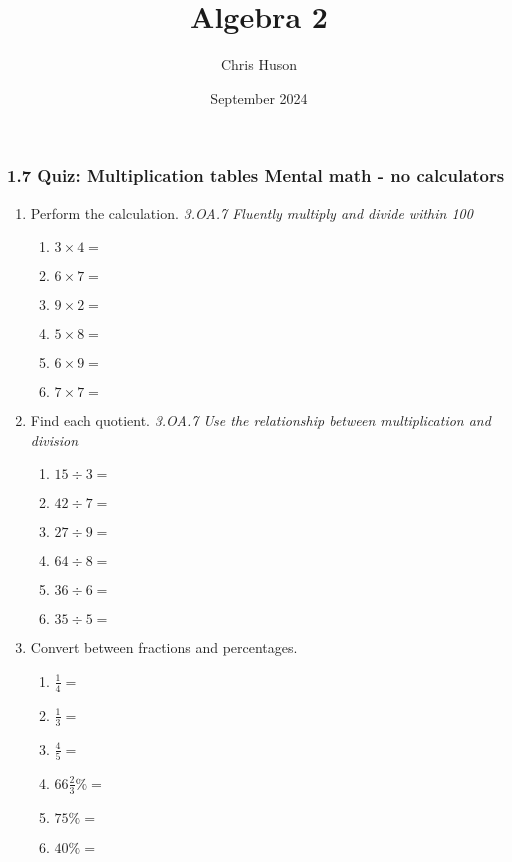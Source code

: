 \documentclass[12pt, twoside]{article}
\title{Algebra 2}
\author{Chris Huson}
\date{September 2024}
\begin{document}
\subsubsection*{1.7 Quiz: Multiplication tables \hfill Mental math - no calculators}
\begin{enumerate}[itemsep=0.5cm]

    \item Perform the calculation. \hfill \emph{3.OA.7 Fluently multiply and divide within 100}
    \begin{multicols}{2}
        \begin{enumerate}[itemsep=0.5cm]
            \item $3 \times 4 =$
            \item $6 \times 7 =$
            \item $9 \times 2 =$
            \item $5 \times 8 =$
            \item $6 \times 9 =$
            \item $7 \times 7 =$
        \end{enumerate}
    \end{multicols}

\item Find each quotient. \hfill \emph{3.OA.7 Use the relationship between multiplication and division}
    \begin{multicols}{2}
        \begin{enumerate}[itemsep=0.5cm]
            \item $15 \div 3 =$
            \item $42 \div 7 =$
            \item $27 \div 9 =$
            \item $64 \div 8 =$
            \item $36 \div 6 =$
            \item $35 \div 5 =$
        \end{enumerate}
    \end{multicols}

\item Convert between fractions and percentages.
\begin{multicols}{2}
\begin{enumerate}[itemsep=0.5cm]
    \item $\frac{1}{4}=$
    \item $\frac{1}{3}=$
    \item $\frac{4}{5}=$
    \item $66 \frac{2}{3}\% =$
    \item $75\% =$
    \item $40\% =$
\end{enumerate}
\end{multicols}


\end{enumerate}
\end{document}
